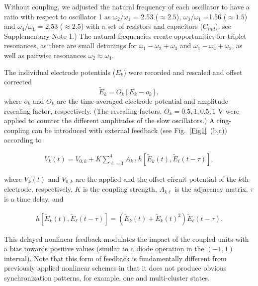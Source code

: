 \documentclass[12pt]{article}
\theoremstyle{plain}
\theoremstyle{definition}
\theoremstyle{remark}
\theoremstyle{remark}
\begin{document}
Without coupling, we adjusted the natural frequency of each oscillator to have a ratio with respect to oscillator 1 as 
$\omega_2/\omega_1$ = 2.53 ($\approx 2.5$), $\omega_3/\omega_1$ =1.56 ($\approx 1.5$)  and $\omega_4/\omega_1$ = 2.53 ($\approx 2.5$)  with a set of resistors and capacitors ($C_{ind}$), see {Supplementary Note 1}.) The natural frequencies create opportunities for triplet resonances, as there are small detunings for $\omega_1 - \omega_2 + \omega_3 $ and $\omega_1 - \omega_4 + \omega_3 $, {\color{black} as well as pairwise resonances $\omega_2 \approx \omega_4$. }

The individual electrode potentials ($E_k$) were recorded and rescaled and offset corrected 
\begin{equation}
\tilde{E}_k=O_k[E_k - o_k],
\end{equation}
where $o_k$ and $O_k$ are the time-averaged electrode potential and amplitude rescaling factor, respectively. (The rescaling factors, $O_k = {0.5 ,1 , 0.5 , 1 }$ V were applied to counter the  different amplitudes of the slow oscillators.) A ring-coupling can be introduced with  external feedback (see Fig.~\ref{Fig1}~(b,c)) according to
\begin{linenomath}
\begin{eqnarray}\label{exp_feed}
V_k(t) = V_{0, k} + K \sum_{\ell=1}^{4}A_{k \ell}h[\tilde{E}_k(t), \tilde{E}_{\ell}(t-\tau)],
\end{eqnarray} 
\end{linenomath}
where $V_k(t)$ and $V_{0, k}$ are the applied and the offset circuit potential of the  $k$th  electrode, respectively, $K$ is the coupling strength, $A_{k \ell}$ is the adjacency matrix, $\tau$ is a time delay, and
\begin{linenomath} 
\begin{eqnarray}\label{non_feed}
h[\tilde E_k(t), \tilde E_{\ell}(t-\tau)]=(\tilde E_k(t)+\tilde E_k(t)^2)\tilde E_{\ell}(t-\tau).
\end{eqnarray} 
\end{linenomath}
This delayed nonlinear feedback modulates the impact of the coupled units with a bias towards  positive values (similar to a diode operation  in the $(-1,1)$ interval).  Note that this form of feedback is fundamentally different from previously applied nonlinear schemes \cite{bick2017robust} in that it does not produce obvious synchronization patterns, for example, one and multi-cluster states.
\end{document}
